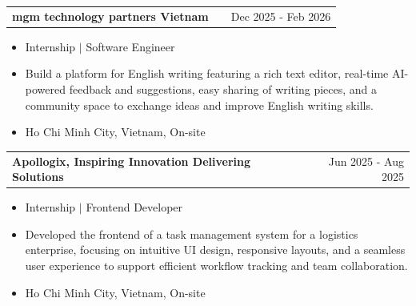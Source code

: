 \documentclass[a4paper,12pt]{article}
\makeatletter
\newenvironment{jobshort}[2]
    {
    \begin{tabularx}{\linewidth}{@{}l X r@{}}
    \textbf{#1} & \hfill &  #2 \\[3.75pt]
    \end{tabularx}
    }
    {
    }
\newenvironment{joblong}[2]
    {
    \begin{tabularx}{\linewidth}{@{}l X r@{}}
    \textbf{#1} & \hfill &  #2 \\[3.75pt]
    \end{tabularx}
    \begin{minipage}[t]{\linewidth}
    \begin{itemize}[nosep,after=\strut, leftmargin=1em, itemsep=3pt,label=--]
    }
    {
    \end{itemize}
    \end{minipage}    
    }
\makeatother
\begin{document}


\begin{joblong}{mgm technology partners Vietnam}{Dec 2025 - Feb 2026}
\item Internship $|$ Software Engineer
\item Build a platform for English writing featuring a rich text editor, real-time AI-powered feedback and suggestions, easy sharing of writing pieces, and a community space to exchange ideas and improve English writing skills.
\item Ho Chi Minh City, Vietnam, On-site
\end{joblong}

\begin{joblong}{Apollogix, Inspiring Innovation Delivering Solutions}{Jun 2025 - Aug 2025}
\item Internship $|$ Frontend Developer
\item Developed the frontend of a task management system for a logistics enterprise, focusing on intuitive UI design, responsive layouts, and a seamless user experience to support efficient workflow tracking and team collaboration.
\item Ho Chi Minh City, Vietnam, On-site
\end{joblong}


\end{document}
